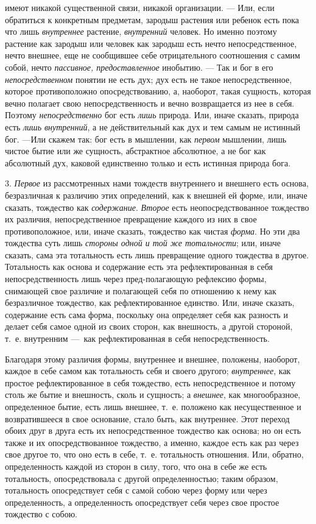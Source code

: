имеют никакой существенной связи, никакой организации. — Или, если
обратиться к конкретным предметам, зародыш растения или ребенок есть пока
что лишь {\em внутреннее} растение,
{\em внутренний} человек. Но именно поэтому растение
как зародыш или человек как зародыш есть нечто непосредственное, нечто
внешнее, еще не сообщившее себе отрицательного соотношения с самим собой,
нечто {\em пассивное, предоставленное} инобытию. — Так
и бог в его {\em непосредственном} понятии не есть дух;
дух есть не такое непосредственное, которое противоположно
опосредствованию, а, наоборот, такая сущность, которая вечно полагает свою
непосредственность и вечно возвращается из нее в себя. Поэтому
{\em непосредственно} бог есть
{\em лишь} природа. Или, иначе сказать, природа есть
{\em лишь внутренний}, а не действительный как дух и
тем самым не истинный бог. —Или скажем так: бог есть в мышлении, как
{\em первом} мышлении, лишь чистое бытие или же
сущность, абстрактное абсолютное, а не бог как абсолютный дух, каковой
единственно только и есть истинная природа бога.

3. {\em Первое} из рассмотренных нами тождеств
внутреннего и внешнего есть основа, безразличная к различию этих
определений, как к внешней ей форме, или, иначе сказать, тождество как
{\em содержание}. {\em Второе} есть
неопосредствованное тождество их различия, непосредственное превращение
каждого из них в свое противоположное, или, иначе сказать, тождество как
чистая {\em форма}. Но эти два тождества суть лишь
{\em стороны одной и той же тотальности}; или, иначе
сказать, сама эта тотальность есть лишь превращение одного тождества в
другое. Тотальность как основа и содержание есть эта рефлектированная в
себя непосредственность лишь через пред-полагающую рефлексию формы,
снимающей свое различие и полагающей себя по отношению к нему как
безразличное тождество, как рефлектированное единство. Или, иначе сказать,
содержание есть сама форма, поскольку она определяет себя как разность и
делает себя самое одной из своих сторон, как внешность, а другой стороной,
т.~е. внутренним —~как рефлектированная в себя непосредственность.

Благодаря этому различия формы, внутреннее и внешнее, положены, наоборот,
каждое в себе самом как тотальность себя и своего другого;
{\em внутреннее}, как простое рефлектированное в себя
тождество, есть непосредственное и потому столь же бытие и внешность, сколь
и сущность; а {\em внешнее}, как многообразное,
определенное бытие, есть лишь внешнее, т.~е. положено как несущественное и
возвратившееся в свое основание, стало быть, как внутреннее. Этот переход
обоих друг в друга есть их непосредственное тождество как основа; но он
есть также и их опосредствованное тождество, а именно, каждое есть как раз
через свое другое то, что оно есть в себе, т.~е. тотальность отношения.
Или, обратно, определенность каждой из сторон в силу, того, что она в себе
же есть тотальность, опосредствовала с другой определенностью; таким
образом, тотальность опосредствует себя с самой собою через форму или через
определенность, а определенность опосредствует себя через свое простое
тождество с собою.


